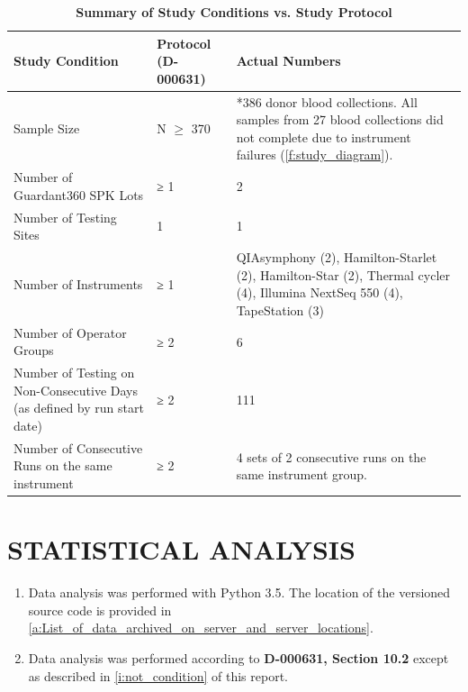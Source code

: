 \documentclass[12pt]{protocol}
\begin{document}
\captionsetup{justification=raggedright,singlelinecheck=off,skip=0pt}
\begin{table}[H]
\centering
\begin{threeparttable}
\caption[Summary of Study Conditions vs. Study Protocol]{\textbf{Summary of Study Conditions vs.
    Study Protocol}}\label{t:study_conditions_actual}
\begin{tabular}{|L{2.0in}|L{1.0in}|L{3.0in}|}
    \hline
    \textbf{Study Condition}  & 
    \textbf{Protocol (D-000631)} & 
    \textbf{Actual Numbers } \\ \hline
    Sample Size & N $\geq$ 370  & *386 donor blood collections. 
        All samples from 27 blood collections did not complete 
        due to instrument failures (\cref{f:study_diagram}). \\ \hline
    Number of Guardant360 SPK Lots & ≥ 1 & 2  \\ \hline
    Number of Testing Sites & 1 & 1 \\ \hline
    Number of Instruments & ≥ 1 & QIAsymphony (2), Hamilton-Starlet (2), 
        Hamilton-Star (2), Thermal cycler (4), Illumina NextSeq 550 (4),
        TapeStation (3) \\ \hline
    Number of Operator Groups & ≥ 2 & 6 \\ \hline
    Number of Testing on Non-Consecutive Days (as defined by run start date) & ≥ 2 & 111 \\ \hline
    Number of Consecutive Runs on the same instrument & ≥ 2 & 4 sets of 2 
        consecutive runs on the same instrument group. \\ \hline
\end{tabular}
\end{threeparttable}
\end{table}

\section{STATISTICAL ANALYSIS}

\begin{enumerate}
    \item Data analysis was performed with Python 3.5.  The location of the versioned source code
        is provided in \cref{a:List_of_data_archived_on_server_and_server_locations}.
    \item Data analysis was performed according to \textbf{D-000631, Section 10.2} except as
        described in \cref{i:not_condition} of this report.
\end{enumerate}
\end{document}

